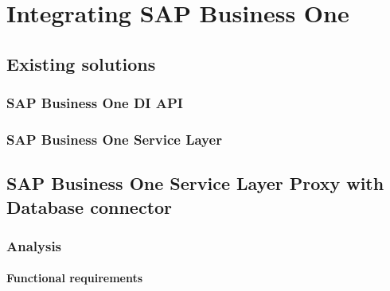 \chapter{Integrating SAP Business One}
\label{chap:integrating-sap-b1}


\section{Existing solutions}
\label{sec:existing-solutions}
\subsection{SAP Business One DI API}
\label{subsec:sap-b1-di-api}
\subsection{SAP Business One Service Layer}
\label{subsec:sap-b1-service-layer}
\section{SAP Business One Service Layer Proxy with Database connector}
\label{sec:sap-b1-service-layer-proxy}
\subsection{Analysis}
\label{subsec:analysis}
\subsubsection{Functional requirements}
\label{subsubs:functional-requirements}
